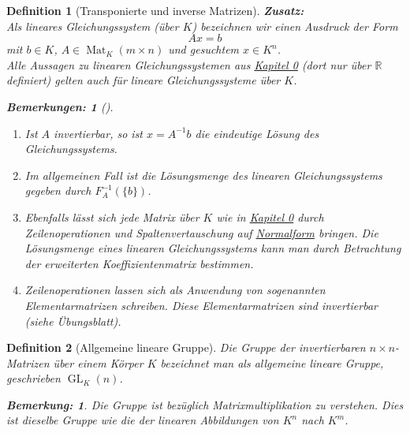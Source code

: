 \documentclass{report}
\newcommand{\R}{\mathbb{R}}
\DeclareMathOperator{\Mat}{Mat}
\DeclareMathOperator{\GL}{GL}
\theoremstyle{customrem}
\newtheorem*{bemerkung}{Bemerkung\textnormal:}
\newtheorem*{bemerkung2}{Bemerkungen\textnormal:}
\newenvironment{bemerkungen}[1][]{\begin{bemerkung2}[#1]\leavevmode}{\end{bemerkung2}}
\theoremstyle{customdef}
\newtheorem{definition}{Definition}[chapter]
\begin{document}
\begin{definition}[Transponierte und inverse Matrizen]
        \vspace{.5cm}
        \textbf{Zusatz:}\\
        Als lineares Gleichungssystem (über $K$) bezeichnen wir einen Ausdruck der Form $$Ax = b $$ mit $b \in K$, $A \in \Mat_K(m\times n)$ und gesuchtem $x \in K^n$.\\
        
        Alle Aussagen zu linearen Gleichungssystemen aus \hyperref[deflingl]{Kapitel 0} (dort nur über $\R$ definiert) gelten auch für lineare Gleichungssysteme über $K$.\\
        
        \begin{bemerkungen}
        	\begin{enumerate}[label = \roman*)]
        		\item Ist $A$ invertierbar, so ist $x = A^{-1}b$ die eindeutige Lösung des Gleichungssystems.
        		\item Im allgemeinen Fall ist die Lösungsmenge des linearen Gleichungssystems gegeben durch $F_A^{-1}(\{b\})$.
        		\item Ebenfalls lässt sich jede Matrix über $K$ wie in \hyperref[deflingl]{Kapitel 0} durch        			Zeilenoperationen und Spaltenvertauschung auf \hyperref[defnormalform]{Normalform} bringen. Die Lösungsmenge eines linearen Gleichungssystems kann man durch Betrachtung der erweiterten Koeffizientenmatrix bestimmen.
        		\item Zeilenoperationen lassen sich als Anwendung von sogenannten Elementarmatrizen schreiben. Diese Elementarmatrizen sind invertierbar (siehe Übungsblatt).
        	\end{enumerate}
        \end{bemerkungen}
    \end{definition}
    
    
    \begin{definition}[Allgemeine lineare Gruppe]
    	Die Gruppe der invertierbaren $n\times n$-Matrizen über einem Körper $K$ bezeichnet man als \textsl{allgemeine lineare Gruppe}, geschrieben $\GL_K(n)$.\\
    	
    	\begin{bemerkung}
    		Die Gruppe ist bezüglich Matrixmultiplikation zu verstehen. Dies ist dieselbe Gruppe wie die der linearen Abbildungen von $K^n$ nach $K^m$.\\
    	\end{bemerkung}
    \end{definition}
    
\end{document}

